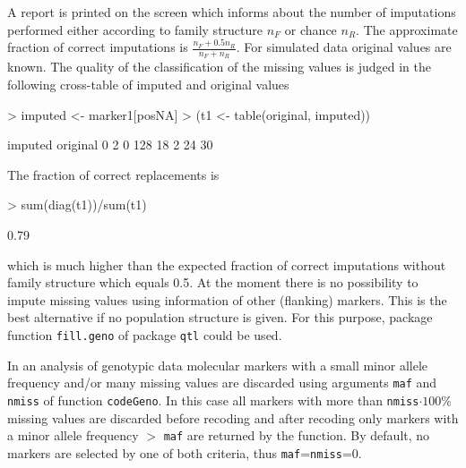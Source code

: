\documentclass[a4paper,11pt]{article}
\begin{document}
A report is printed on the screen which informs about the number of imputations performed either according to family structure $n_F$ or chance $n_R$. The approximate fraction of correct imputations is $\frac{n_F + 0.5n_R}{n_F+n_R}$. For simulated data  
original values are known. The quality of the classification of the missing values is judged in the following cross-table of imputed and original values
\begin{Schunk}
\begin{Sinput}
> imputed <- marker1[posNA]
> (t1 <- table(original, imputed))
\end{Sinput}
\begin{Soutput}
        imputed
original   0   2
       0 128  18
       2  24  30
\end{Soutput}
\end{Schunk}
The fraction of correct replacements is
\begin{Schunk}
\begin{Sinput}
> sum(diag(t1))/sum(t1)
\end{Sinput}
\begin{Soutput}
[1] 0.79
\end{Soutput}
\end{Schunk}
which is much higher than the expected fraction of correct imputations without family structure which equals 0.5. At the moment there is no possibility to impute missing values using information of other (flanking) markers. This is the best alternative if no population structure is given. For this purpose, package function \texttt{fill.geno} of package \texttt{qtl} could be used. 

In an analysis of genotypic data molecular markers with a small minor allele frequency and/or many missing values are discarded using arguments \texttt{maf} and \texttt{nmiss} of function \texttt{codeGeno}. 
In this case all markers with more than
\texttt{nmiss}$\cdot 100\%$ missing values are discarded before recoding and after recoding only markers with a minor allele frequency $>$ \texttt{maf} are returned by the function. 
By default, no markers are selected by one of both criteria, thus \texttt{maf}=\texttt{nmiss}=0.
                                       
\end{document}
